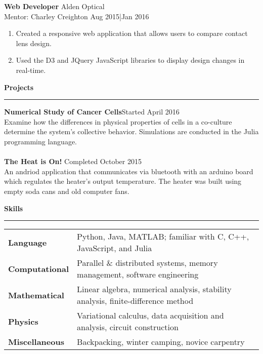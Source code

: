 \documentclass{article}
\newcommand{\fullbar}{\rule{\textwidth}{0.4pt}} %
\newcommand{\heading}[1]{{\Large\textbf{#1}\vspace{-.2cm}\newline\fullbar}} %
\newcommand{\job}[5]{
	\textbf{#1} \hfill #2\\
	Mentor: #3 \hfill #4|#5
	}
\newcommand{\secspace}{.1cm}
\newcommand{\dash}{\item[-]\vspace{-.05cm}}
\begin{document}
\job{Web Developer}{Alden Optical}{Charley Creighton}{Aug 2015}{Jan 2016}
\begin{enumerate}
	\dash Created a responsive web application that allows users to compare contact lens design.
	\dash Used the D3 and JQuery JavaScript libraries to display design changes in real-time.
\end{enumerate}

\vspace{.3cm}
\heading{Projects}

\vspace{.1cm}
	\textbf{Numerical Study of Cancer Cells}\hfill Started April 2016\\
	Examine how the differences in physical  properties of cells in a co-culture determine the system's collective behavior. Simulations are conducted in the Julia programming language.\\\\
	\textbf{The Heat is On!} \hfill Completed October 2015\\
	An andriod application that communicates via bluetooth with an arduino board which regulates the heater's output temperature. The heater was built using empty soda cans and old computer fans. \\
	
\vspace{\secspace}
\heading{Skills}
\vspace{-.65cm}
\begin{table}[h]
	\hspace{-.3cm}
	\begin{tabular}{l l}
		\textbf{Language} & Python, Java, MATLAB; familiar with C, C++, JavaScript, and Julia\\
		\textbf{Computational} & Parallel \& distributed systems, memory management, software engineering \\
		\textbf{Mathematical} & Linear algebra, numerical analysis, stability analysis, finite-difference method\\
		\textbf{Physics} & Variational calculus, data acquisition and analysis, circuit construction\\
		\textbf{Miscellaneous} & Backpacking, winter camping, novice carpentry 
	\end{tabular}
\end{table}
\end{document}
